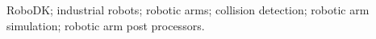 ﻿%
RoboDK; industrial robots; robotic arms; collision detection; robotic arm simulation; robotic arm post processors.


